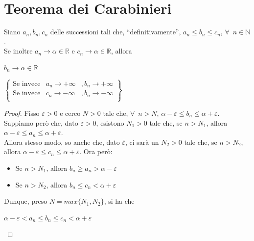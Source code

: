 \documentclass{article}
\theoremstyle{definition}
\newcommand{\virgolette}[1]{``#1''}
\begin{document}
\newpage
\section{Teorema dei Carabinieri}
Siano $a_n,b_n,c_n$ delle successioni tali che, \virgolette{definitivamente}, $a_n \leqslant b_n \leqslant c_n$, $\forall \,\,\, n \in \mathbb{N}$.
\\
Se inoltre $a_n \longrightarrow \alpha \in \mathbb{R}$ e $c_n \longrightarrow \alpha \in \mathbb{R}$, allora
\begin{center}
    $b_n \longrightarrow \alpha \in \mathbb{R}$
\end{center}
$\left\{ \begin{array}{ccc}
  \mbox{Se invece}   & a_n \longrightarrow +\infty &,b_n \longrightarrow +\infty\\
   \mbox{Se invece}   & c_n \longrightarrow -\infty &,b_n \longrightarrow -\infty\\
\end{array}\right\}$
\begin{proof}
    Fisso $\varepsilon>0$ e cerco $N>0$ tale che, $\forall \,\,\, n>N$, $\alpha - \varepsilon \leqslant b_n \leqslant \alpha + \varepsilon$.
    \\
    Sappiamo però che, dato $\overline{\varepsilon}>0$, esistono $N_1>0$ tale che, se $n>N_1$, allora $\alpha - \varepsilon \leqslant a_n \leqslant \alpha + \varepsilon$.
    \\
    Allora stesso modo, so anche che, dato $\overline{\varepsilon}$, ci sarà un $N_2>0$ tale che, se $n>N_2$, allora $\alpha - \varepsilon \leqslant c_n \leqslant \alpha + \varepsilon$.
    Ora però:
    \begin{itemize}
        \item Se $n>N_1$, allora $b_n \geqslant a_n > \alpha - \varepsilon$
        \item Se $n>N_2$, allora $b_n \leqslant c_n < \alpha + \varepsilon$
    \end{itemize}
    Dunque, preso $N=max\{N_1,N_2\}$, si ha che
    \begin{center}
        $\alpha - \varepsilon < a_n \leqslant b_n\leqslant c_n <\alpha + \varepsilon$
    \end{center}
\end{proof}
\end{document}
